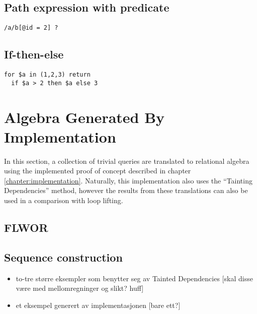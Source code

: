 \subsection{Path expression with predicate}
\begin{Verbatim}
/a/b[@id = 2] ?
\end{Verbatim}

\subsection{If-then-else}
\begin{Verbatim}
for $a in (1,2,3) return 
  if $a > 2 then $a else 3
\end{Verbatim}


\section{Algebra Generated By Implementation}
In this section, a collection of trivial queries are translated to relational
algebra using the implemented proof of concept described in chapter
\ref{chapter:implementation}. Naturally, this implementation also uses the
``Tainting Dependencies'' method, however the results from these translations
can also be used in a comparison with loop lifting.

\subsection{FLWOR}
\subsection{Sequence construction}

\begin{itemize}
  \item to-tre større eksempler som benytter seg av Tainted Dependencies [skal
  disse v\ae re med mellomregninger og slikt? huff]
  \item et eksempel generert av implementasjonen [bare ett?]
\end{itemize}